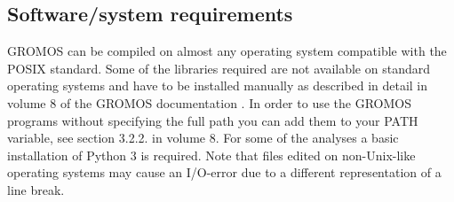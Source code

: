 \subsection{Software/system requirements}
%
GROMOS can be compiled on almost any operating system compatible with the POSIX standard.
 Some of the libraries required are not available on standard operating systems and have to be installed 
manually as described in detail in volume 8 of the GROMOS documentation \cite{volume_8}. 
In order to use the GROMOS programs without specifying the full path you can add them to your PATH variable, see section 3.2.2. in volume 8.
For some of the analyses a basic installation of Python 3 is required. 
Note that files edited on non-Unix-like operating systems may cause an I/O-error due to a different representation of a line break.

